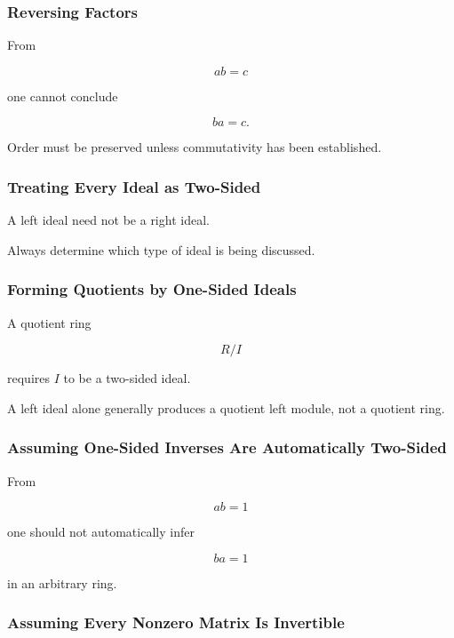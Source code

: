 \subsubsection{Reversing Factors}

From

\[ ab=c \]

one cannot conclude

\[ ba=c. \]

Order must be preserved unless commutativity has been established.

\subsubsection{Treating Every Ideal as Two-Sided}

A left ideal need not be a right ideal.

Always determine which type of ideal is being discussed.

\subsubsection{Forming Quotients by One-Sided Ideals}

A quotient ring

\[ R/I \]

requires \(I\) to be a two-sided ideal.

A left ideal alone generally produces a quotient left module, not a quotient
ring.

\subsubsection{Assuming One-Sided Inverses Are Automatically Two-Sided}

From

\[ ab=1 \]

one should not automatically infer

\[ ba=1 \]

in an arbitrary ring.

\subsubsection{Assuming Every Nonzero Matrix Is Invertible}

